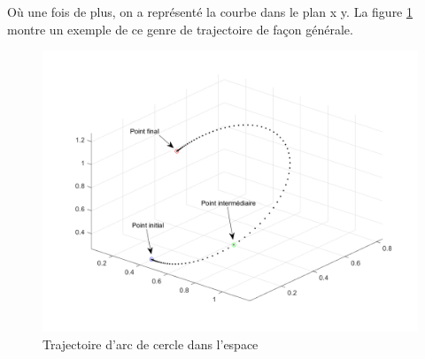 \documentclass{article} %
\begin{document}
O\`{u} une fois de plus, on a repr\'{e}sent\'{e} la courbe dans le plan x y. La figure \ref{eller6} montre un exemple de ce genre de trajectoire de fa\c{c}on g\'{e}n\'{e}rale.


\begin{figure}[h]
	\includegraphics[width=\textwidth]{TrajFig6.png}
	\caption{Trajectoire d'arc de cercle dans l'espace}
	\label{eller6}
\end{figure}
\end{document}
